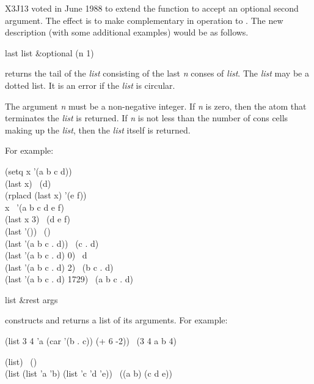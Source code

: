 \begin{new}
X3J13 voted in June 1988
to extend the  function to accept
an optional second argument.  The effect is to make 
complementary in operation to .
The new description (with some additional examples) would be as follows.

\begin{defun}[Function]
last list &optional (n 1)

 returns the tail of the {\it list}
consisting of the last {\it n} conses of {\it list}.  The {\it list} may
be a dotted list.  It is an error if the {\it list} is circular.

The argument {\it n} must be a non-negative integer.
If {\it n} is zero, then the atom that terminates the {\it list}
is returned.  If {\it n} is not less than the number of cons cells
making up the {\it list}, then the {\it list} itself is returned.

For example:
\begin{lisp}
(setq x '(a b c d)) \\
(last x) \EV\ (d) \\
(rplacd (last x) '(e f)) \\
x \EV\ '(a b c d e f) \\
(last x 3) \EV\ (d e f) \\
(last '()) \EV\ () \\
(last '(a b c . d)) \EV\ (c . d) \\
(last '(a b c . d) 0) \EV\ d \\
(last '(a b c . d) 2) \EV\ (b c . d) \\
(last '(a b c . d) 1729) \EV\ (a b c . d)
\end{lisp}
\end{defun}
\end{new}

\begin{defun}[Function]
list &rest args

 constructs and returns a list of its arguments.
For example:
\begin{lisp}
(list 3 4 'a (car '(b . c)) (+ 6 -2)) \EV\ (3 4 a b 4)
\end{lisp}

\begin{newer}
\begin{lisp}
(list) \EV\ () \\
(list (list 'a 'b) (list 'c 'd 'e)) \EV\ ((a b) (c d e))
\end{lisp}
\end{newer}
\end{defun}

